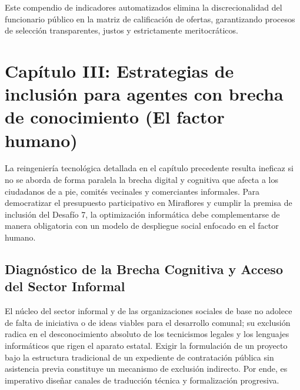 \documentclass[12pt,a4paper]{article}
\begin{document}
Este compendio de indicadores automatizados elimina la discrecionalidad del funcionario público en la matriz de calificación de ofertas, garantizando procesos de selección transparentes, justos y estrictamente meritocráticos.

\newpage

\section{Capítulo III: Estrategias de inclusión para agentes con brecha de conocimiento (El factor humano)}

La reingeniería tecnológica detallada en el capítulo precedente resulta ineficaz si no se aborda de forma paralela la brecha digital y cognitiva que afecta a los ciudadanos de a pie, comités vecinales y comerciantes informales. Para democratizar el presupuesto participativo en Miraflores y cumplir la premisa de inclusión del Desafío 7, la optimización informática debe complementarse de manera obligatoria con un modelo de despliegue social enfocado en el factor humano.

\subsection{Diagnóstico de la Brecha Cognitiva y Acceso del Sector Informal}
El núcleo del sector informal y de las organizaciones sociales de base no adolece de falta de iniciativa o de ideas viables para el desarrollo comunal; su exclusión radica en el desconocimiento absoluto de los tecnicismos legales y los lenguajes informáticos que rigen el aparato estatal. Exigir la formulación de un proyecto bajo la estructura tradicional de un expediente de contratación pública sin asistencia previa constituye un mecanismo de exclusión indirecto. Por ende, es imperativo diseñar canales de traducción técnica y formalización progresiva.
\end{document}
